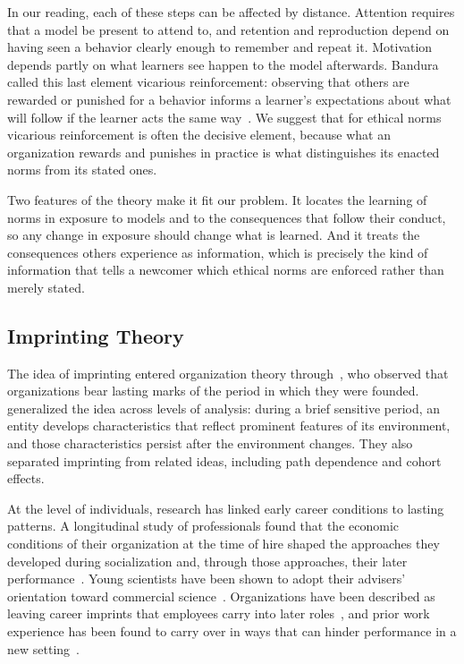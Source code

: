 In our reading, each of these steps can be affected by distance. Attention requires that a model be present to attend to, and retention and reproduction depend on having seen a behavior clearly enough to remember and repeat it. Motivation depends partly on what learners see happen to the model afterwards. Bandura called this last element vicarious reinforcement: observing that others are rewarded or punished for a behavior informs a learner's expectations about what will follow if the learner acts the same way~\citep{bandura1977social}. We suggest that for ethical norms vicarious reinforcement is often the decisive element, because what an organization rewards and punishes in practice is what distinguishes its enacted norms from its stated ones.

Two features of the theory make it fit our problem. It locates the learning of norms in exposure to models and to the consequences that follow their conduct, so any change in exposure should change what is learned. And it treats the consequences others experience as information, which is precisely the kind of information that tells a newcomer which ethical norms are enforced rather than merely stated.

\subsection{Imprinting Theory}

The idea of imprinting entered organization theory through~\citet{stinchcombe1965social}, who observed that organizations bear lasting marks of the period in which they were founded. \citet{marquis2013imprinting} generalized the idea across levels of analysis: during a brief sensitive period, an entity develops characteristics that reflect prominent features of its environment, and those characteristics persist after the environment changes. They also separated imprinting from related ideas, including path dependence and cohort effects.

At the level of individuals, research has linked early career conditions to lasting patterns. A longitudinal study of professionals found that the economic conditions of their organization at the time of hire shaped the approaches they developed during socialization and, through those approaches, their later performance~\citep{tilcsik2014imprint}. Young scientists have been shown to adopt their advisers' orientation toward commercial science~\citep{azoulay2017social}. Organizations have been described as leaving career imprints that employees carry into later roles~\citep{higgins2005career}, and prior work experience has been found to carry over in ways that can hinder performance in a new setting~\citep{dokko2009unpacking}.

